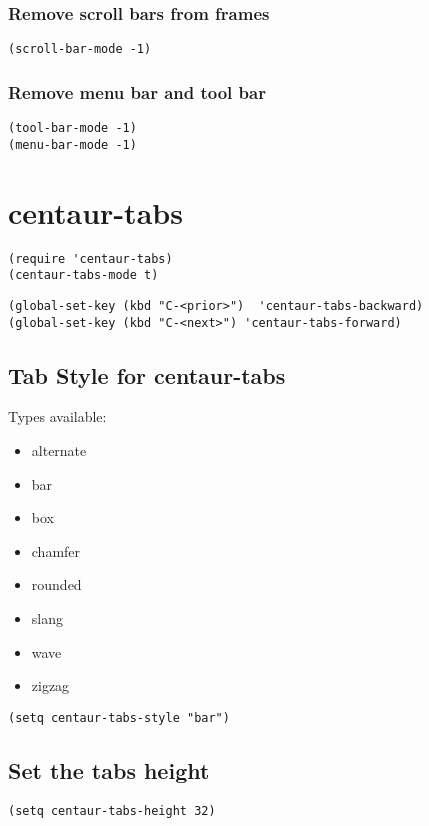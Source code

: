 \documentclass[11pt]{article}
\begin{document}
\subsubsection*{Remove scroll bars from frames}
\label{sec:org90664c9}
\begin{verbatim}
(scroll-bar-mode -1)
\end{verbatim}

\subsubsection*{Remove menu bar and tool bar}
\label{sec:org46f5f53}
\begin{verbatim}
(tool-bar-mode -1)
(menu-bar-mode -1)
\end{verbatim}


\section*{centaur-tabs}
\label{sec:org50a7e1d}

\begin{verbatim}
(require 'centaur-tabs)
(centaur-tabs-mode t)
\end{verbatim}

\begin{verbatim}
(global-set-key (kbd "C-<prior>")  'centaur-tabs-backward)
(global-set-key (kbd "C-<next>") 'centaur-tabs-forward)
\end{verbatim}

\subsection*{Tab Style for centaur-tabs}
\label{sec:org0aa69d5}
Types available: 
\begin{itemize}
\item alternate
\item bar
\item box
\item chamfer
\item rounded
\item slang
\item wave
\item zigzag
\end{itemize}

\begin{verbatim}
(setq centaur-tabs-style "bar")
\end{verbatim}

\subsection*{Set the tabs height}
\label{sec:org53676d8}
\begin{verbatim}
(setq centaur-tabs-height 32)
\end{verbatim}
\end{document}
